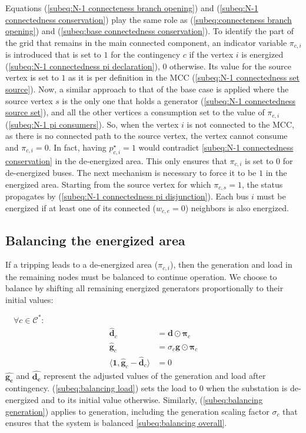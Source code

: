 Equations (\ref{subeq:N-1 connecteness branch opening}) and (\ref{subeq:N-1
connectedness conservation}) play the same role as (\ref{subeq:connecteness
branch opening}) and (\ref{subeq:base connectedness conservation}). To identify
the part of the grid that remains in the main connected component, an indicator variable
$\pi_{c,i}$ is introduced that is set to $1$ for the contingency $c$ if the vertex
$i$ is energized (\ref{subeq:N-1 connectedness pi declaration}), $0$ otherwise. Its value
for the source vertex is set to $1$ as it is per definition in the MCC (\ref{subeq:N-1
connectedness set source}). Now, a similar approach to that of the base case is applied
where the source vertex $s$ is the only one that holds a generator (\ref{subeq:N-1
connectedness source set}), and all the other vertices a consumption set to the
value of $\pi_{c,i}$ (\ref{subeq:N-1 pi consumers}). So, when the vertex $i$ is
not connected to the MCC, as there is no connected path to the source vertex,
the vertex cannot consume and $\pi_{c,i}=0$. In fact, having $p^{\star}_{c,i}=1$
would contradict \ref{subeq:N-1 connectedness conservation} in the
de-energized area.
This only ensures that $\pi_{c,i}$ is set to 0 for de-energized buses. The next mechanism is
necessary to force it to be $1$ in the energized area. Starting from the source
vertex for which $\pi_{c,s}=1$, the status propagates by (\ref{subeq:N-1
connectedness pi disjunction}). 
Each bus $i$ must be energized if at least one of its connected ($w_{c,e}=0$) neighbors is also energized. 

\subsection{Balancing the energized area}\label{ss:balancing}
If a tripping leads to a de-energized area ($\pi_{c, i}$), then the generation and load in the remaining nodes must be
balanced to continue operation. 
We choose to balance by shifting all remaining energized generators
proportionally to their initial values:

$\quad \forall c \in \mathcal{C}^{*}$:
\begin{subequations}
    \begin{align}
        \pmb{\hat{d}}_{c}                                          & = \pmb{d}\odot \pmb{\pi}_{c}\label{subeq:balancing load}                 \\
        \pmb{\hat{g}}_{c}                                          & = \sigma_{c}\pmb{g}\odot \pmb{\pi}_{c}\label{subeq:balancing generation} \\
        \langle\pmb{1}, \hat{\pmb{g}}_{c}- \hat{\pmb{d}}_{c}\rangle & = 0 \label{subeq:balancing overall}
    \end{align}
    \label{eq:N-1 balancing}
\end{subequations}
$\pmb{\hat{g_c}}$ and $\pmb{\hat{d_c}}$ represent the adjusted values of the
generation and load after contingency. (\ref{subeq:balancing load}) sets the
load to 0 when the substation is de-energized and to its initial value otherwise.
Similarly, (\ref{subeq:balancing generation}) applies to generation, including the generation scaling factor $\sigma_{c}$ that ensures that the system is balanced \eqref{subeq:balancing overall}.

